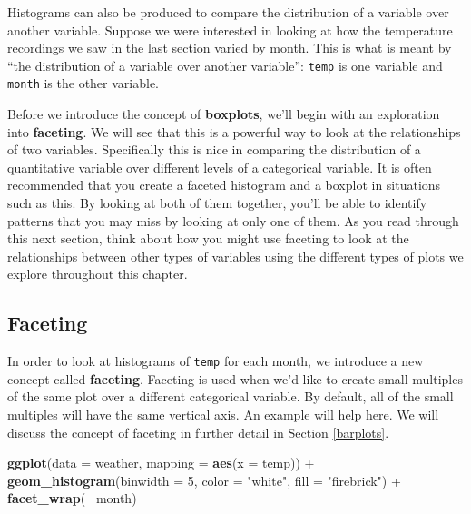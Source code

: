 \documentclass[]{tufte-book}
\newenvironment{Shaded}{\begin{snugshade}}{\end{snugshade}}
\newcommand{\KeywordTok}[1]{\textcolor[rgb]{0.13,0.29,0.53}{\textbf{{#1}}}}
\newcommand{\DataTypeTok}[1]{\textcolor[rgb]{0.13,0.29,0.53}{{#1}}}
\newcommand{\DecValTok}[1]{\textcolor[rgb]{0.00,0.00,0.81}{{#1}}}
\newcommand{\StringTok}[1]{\textcolor[rgb]{0.31,0.60,0.02}{{#1}}}
\newcommand{\NormalTok}[1]{{#1}}
\begin{document}
Histograms can also be produced to compare the distribution of a
variable over another variable. Suppose we were interested in looking at
how the temperature recordings we saw in the last section varied by
month. This is what is meant by ``the distribution of a variable over
another variable'': \texttt{temp} is one variable and \texttt{month} is
the other variable.

Before we introduce the concept of \textbf{boxplots}, we'll begin with
an exploration into \textbf{faceting}. We will see that this is a
powerful way to look at the relationships of two variables. Specifically
this is nice in comparing the distribution of a quantitative variable
over different levels of a categorical variable. It is often recommended
that you create a faceted histogram and a boxplot in situations such as
this. By looking at both of them together, you'll be able to identify
patterns that you may miss by looking at only one of them. As you read
through this next section, think about how you might use faceting to
look at the relationships between other types of variables using the
different types of plots we explore throughout this chapter.

\subsection{Faceting}\label{faceting}

In order to look at histograms of \texttt{temp} for each month, we
introduce a new concept called \textbf{faceting}. Faceting is used when
we'd like to create small multiples of the same plot over a different
categorical variable. By default, all of the small multiples will have
the same vertical axis. An example will help here. We will discuss the
concept of faceting in further detail in Section \ref{barplots}.

\begin{Shaded}
\begin{Highlighting}[]
\KeywordTok{ggplot}\NormalTok{(}\DataTypeTok{data =} \NormalTok{weather, }\DataTypeTok{mapping =} \KeywordTok{aes}\NormalTok{(}\DataTypeTok{x =} \NormalTok{temp)) +}
\StringTok{  }\KeywordTok{geom_histogram}\NormalTok{(}\DataTypeTok{binwidth =} \DecValTok{5}\NormalTok{, }\DataTypeTok{color =} \StringTok{"white"}\NormalTok{, }\DataTypeTok{fill =} \StringTok{"firebrick"}\NormalTok{) +}
\StringTok{  }\KeywordTok{facet_wrap}\NormalTok{(~}\StringTok{ }\NormalTok{month)}
\end{Highlighting}
\end{Shaded}
\end{document}
